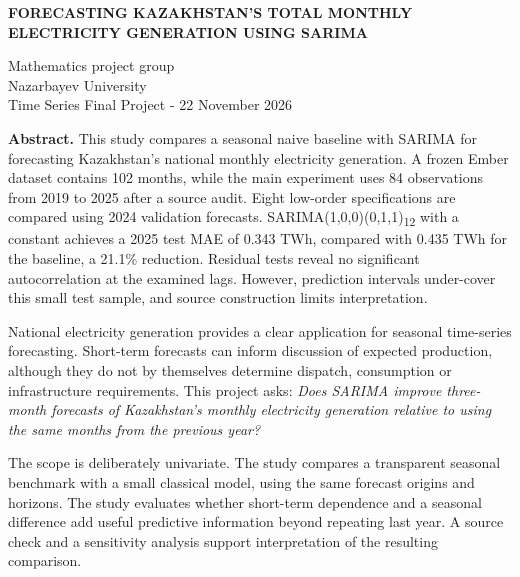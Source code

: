 \documentclass[11pt,a4paper]{article}
\begin{document}
\fontsize{10.5}{13.5}\selectfont

\begin{center}{\bfseries\fontsize{18}{21}\selectfont FORECASTING KAZAKHSTAN'S TOTAL MONTHLY\\ELECTRICITY GENERATION USING SARIMA}\end{center}

\begin{center}{\fontsize{10}{13}\selectfont Mathematics project group\\Nazarbayev University\\Time Series Final Project - 22 November 2026}\end{center}

\textbf{Abstract.} This study compares a seasonal naive baseline with SARIMA for forecasting Kazakhstan's national monthly electricity generation. A frozen Ember dataset contains 102 months, while the main experiment uses 84 observations from 2019 to 2025 after a source audit. Eight low-order specifications are compared using 2024 validation forecasts. SARIMA(1,0,0)(0,1,1)\textsubscript{12} with a constant achieves a 2025 test MAE of 0.343 TWh, compared with 0.435 TWh for the baseline, a 21.1\% reduction. Residual tests reveal no significant autocorrelation at the examined lags. However, prediction intervals under-cover this small test sample, and source construction limits interpretation.\par

\par{}\par\vspace{2pt}

National electricity generation provides a clear application for seasonal time-series forecasting. Short-term forecasts can inform discussion of expected production, although they do not by themselves determine dispatch, consumption or infrastructure requirements. This project asks: \textit{Does SARIMA improve three-month forecasts of Kazakhstan's monthly electricity generation relative to using the same months from the previous year?}\par

The scope is deliberately univariate. The study compares a transparent seasonal benchmark with a small classical model, using the same forecast origins and horizons. The study evaluates whether short-term dependence and a seasonal difference add useful predictive information beyond repeating last year. A source check and a sensitivity analysis support interpretation of the resulting comparison.\par
\end{document}
